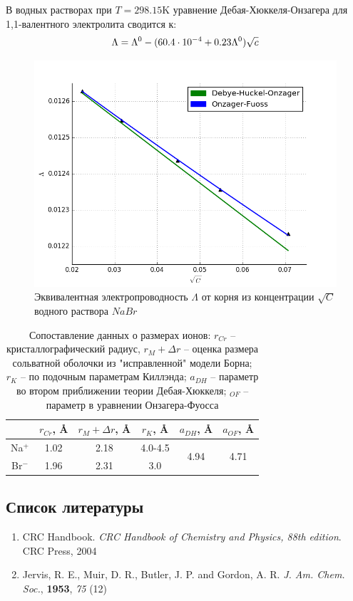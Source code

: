 \documentclass[13pt]{extarticle}
\begin{document}
В водных растворах при $T = 298.15$K уравнение Дебая-Хюккеля-Онзагера для 1,1-валентного электролита сводится к:
\begin{gather}
	\Lambda = \Lambda^0 - ( 60.4 \cdot 10^{-4} + 0.23 \Lambda^0 ) \sqrt{c} \notag
\end{gather}

\begin{figure}[!ht]
\centering
\includegraphics[scale = 0.6]{../pictures/ofu.png}
\caption{Эквивалентная электропроводность $\Lambda$ от корня из концентрации $\sqrt{C}$ водного раствора $NaBr$}
\end{figure}

\begin{table}
\centering
\begin{tabular}{|c|c|c|c|c|c|}
	\hline
	& $r_{Cr}$, \AA & $r_M + \Delta r$, \AA & $r_K$, \AA & $a_{DH}$, \AA & $a_{OF}$, \AA \\
	\hline
	Na$^{+}$ & 1.02 & 2.18 & 4.0-4.5 & \multirow{2}{*}{4.94} & \multirow{2}{*}{4.71} \\
	Br$^{-}$ & 1.96 & 2.31 & 3.0 & & \\
	\hline
\end{tabular}
\caption{Сопоставление данных о размерах ионов: $r_{Cr}$ -- кристаллографический радиус, $r_M + \Delta r$ -- оценка размера сольватной оболочки из "исправленной" модели Борна; $r_K$ -- по подочным параметрам Киллэнда; $a_{DH}$ -- параметр во втором приближении теории Дебая-Хюккеля; $_{OF}$ -- параметр в уравнении Онзагера-Фуосса}
\end{table}

\subsection*{Список литературы}
\begin{enumerate}
	\item CRC Handbook. \textit{CRC Handbook of Chemistry and Physics, 88th edition}. CRC Press, 2004
	\item Jervis, R. E., Muir, D. R., Butler, J. P. and Gordon, A. R. \textit{J. Am. Chem. Soc.}, \textbf{1953}, \textit{75} (12)
\end{enumerate}
\end{document}
